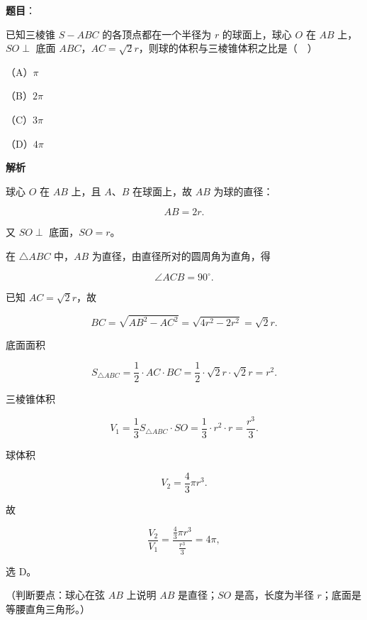 \begin{answer}

\textbf{题目}：

已知三棱锥 $S-ABC$ 的各顶点都在一个半径为 $r$ 的球面上，球心 $O$ 在 $AB$ 上，$SO\perp$ 底面 $ABC$，$AC=\sqrt2r$，则球的体积与三棱锥体积之比是（　）

（A）$\pi$

（B）$2\pi$

（C）$3\pi$

（D）$4\pi$

\textbf{解析}

球心 $O$ 在 $AB$ 上，且 $A$、$B$ 在球面上，故 $AB$ 为球的直径：

\nopagebreak[4]
\[AB=2r.\]

又 $SO\perp$ 底面，$SO=r$。

在 $\triangle ABC$ 中，$AB$ 为直径，由直径所对的圆周角为直角，得

\nopagebreak[4]
\[\angle ACB=90^\circ.\]

已知 $AC=\sqrt2r$，故

\nopagebreak[4]
\[BC=\sqrt{AB^2-AC^2}=\sqrt{4r^2-2r^2}=\sqrt2r.\]

底面面积

\nopagebreak[4]
\[S_{\triangle ABC}=\frac12\cdot AC\cdot BC=\frac12\cdot\sqrt2r\cdot\sqrt2r=r^2.\]

三棱锥体积

\nopagebreak[4]
\[V_1=\frac13S_{\triangle ABC}\cdot SO=\frac13\cdot r^2\cdot r=\frac{r^3}{3}.\]

球体积

\nopagebreak[4]
\[V_2=\frac43\pi r^3.\]

故

\nopagebreak[4]
\[\frac{V_2}{V_1}=\frac{\frac43\pi r^3}{\frac{r^3}{3}}=4\pi,\]

选 D。

（判断要点：球心在弦 $AB$ 上说明 $AB$ 是直径；$SO$ 是高，长度为半径 $r$；底面是等腰直角三角形。）


\end{answer}
